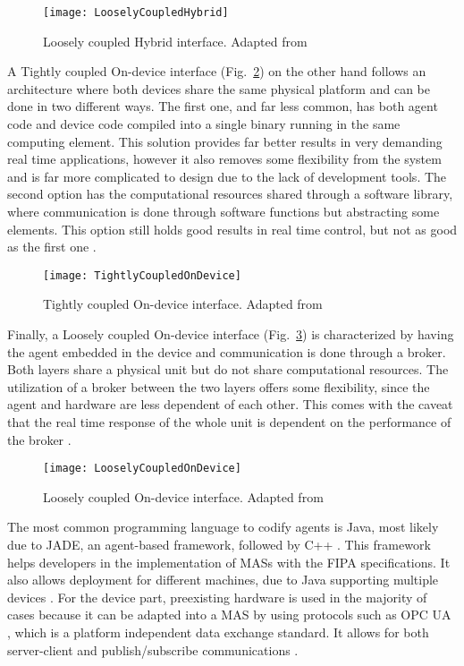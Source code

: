 \begin{figure}[hbt!]
	\centering
	\texttt{[image: LooselyCoupledHybrid]}
	\caption{Loosely coupled Hybrid interface. Adapted from \cite{8591641}}
	\label{fig:loosely_coupled_hybrid}
\end{figure}

A Tightly coupled On-device interface (Fig.~\ref{fig:tightly_coupled_ondevice}) on the other hand follows an architecture where both devices share the same physical platform and can be done in two different ways. The first one, and far less common, has both agent code and device code compiled into a single binary running in the same computing element. This solution provides far better results in very demanding real time applications, however it also removes some flexibility from the system and is far more complicated to design due to the lack of development tools. The second option has the computational resources shared through a software library, where communication is done through software functions but abstracting some elements. This option still holds good results in real time control, but not as good as the first one \cite{8591641}.\\

\begin{figure}[hbt!]
	\centering
	\texttt{[image: TightlyCoupledOnDevice]}
	\caption{Tightly coupled On-device interface. Adapted from \cite{8591641}}
	\label{fig:tightly_coupled_ondevice}
\end{figure}

Finally, a Loosely coupled On-device interface (Fig.~\ref{fig:loosely_coupled_ondevice}) is characterized by having the agent embedded in the device and communication is done through a broker. Both layers share a physical unit but do not share computational resources. The utilization of a broker between the two layers offers some flexibility, since the agent and hardware are less dependent of each other. This comes with the caveat that the real time response of the whole unit is dependent on the performance of the broker \cite{8591641}.\\

\begin{figure}[hbt!]
	\centering
	\texttt{[image: LooselyCoupledOnDevice]}
	\caption{Loosely coupled On-device interface. Adapted from \cite{8591641}}
	\label{fig:loosely_coupled_ondevice}
\end{figure}

The most common programming language to codify agents is Java, most likely due to JADE, an agent-based framework, followed by C++ \cite{8591641}. This framework helps developers in the implementation of MASs  with the FIPA specifications. It also allows deployment for different machines, due to Java supporting multiple devices \cite{JADE_website}.
For the device part, preexisting hardware is used in the majority of cases because it can be adapted into a MAS by using protocols such as OPC UA \cite{8591641}, which is a platform independent data exchange standard. It allows for both server-client and publish/subscribe communications \cite{OPCUA_website}.


